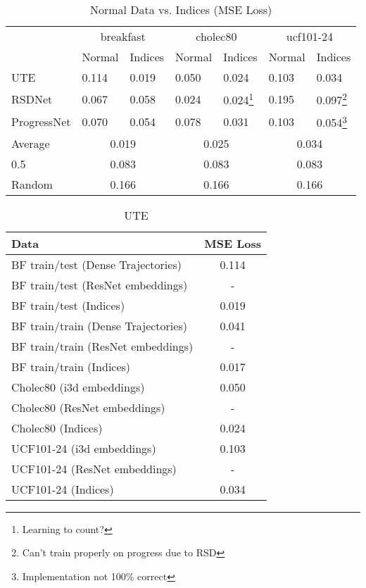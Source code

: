 \documentclass[10pt,twocolumn,letterpaper]{article}
\begin{document}
\begin{table*}
  \centering
  \begin{tabular}{l|ll|ll|ll}
    \toprule
     & \multicolumn{2}{|c|}{breakfast} & \multicolumn{2}{|c|}{cholec80} & \multicolumn{2}{|c}{ucf101-24} \\
     & Normal & Indices & Normal & Indices & Normal & Indices \\
    \midrule
    UTE & 0.114 & 0.019 & 0.050 & 0.024 & 0.103 & 0.034 \\
    RSDNet & 0.067 & 0.058 & 0.024 & 0.024\footnote{Learning to count?}  & 0.195 & 0.097\footnote{Can't train properly on progress due to RSD} \\
    ProgressNet & 0.070 & 0.054 & 0.078 & 0.031 & 0.103 & 0.054\footnote{Implementation not 100\% correct} \\
    \midrule
    Average & \multicolumn{2}{|c|}{0.019} & \multicolumn{2}{|c|}{0.025} & \multicolumn{2}{|c}{0.034} \\
    0.5 & \multicolumn{2}{|c|}{0.083} & \multicolumn{2}{|c|}{0.083} & \multicolumn{2}{|c}{0.083} \\
    Random & \multicolumn{2}{|c|}{0.166} & \multicolumn{2}{|c|}{0.166} & \multicolumn{2}{|c}{0.166} \\

    \bottomrule
  \end{tabular}
  \caption{Normal Data vs. Indices (MSE Loss)}
  \label{tab:overview}
\end{table*}

\begin{table}
   \centering
   \begin{tabular}{@{}lc@{}}
     \toprule
     Data & MSE Loss \\
     \midrule
     BF train/test (Dense Trajectories) & 0.114 \\
     BF train/test (ResNet embeddings) & - \\
     BF train/test (Indices) & 0.019 \\

     BF train/train (Dense Trajectories) & 0.041 \\
     BF train/train (ResNet embeddings) & - \\
     BF train/train (Indices) & 0.017 \\

     \midrule
     Cholec80 (i3d embeddings) & 0.050 \\
     Cholec80 (ResNet embeddings) & - \\
     Cholec80 (Indices) & 0.024 \\ 

     \midrule
     UCF101-24 (i3d embeddings) & 0.103 \\
     UCF101-24 (ResNet embeddings) & - \\
     UCF101-24 (Indices) & 0.034\\

     \bottomrule
   \end{tabular}
   \caption{UTE}
   \label{tab:ute}
 \end{table}
\end{document}
